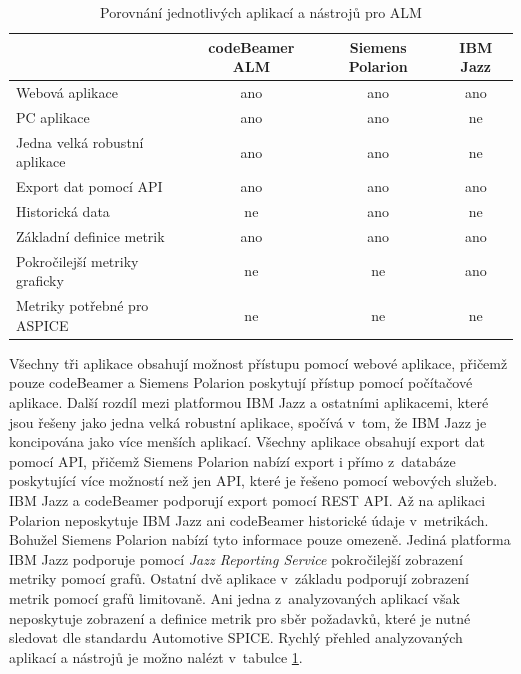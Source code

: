 \documentclass[czech,master]{diploma}
\begin{document}
\begin{table}[htp]
\begin{tabular}{@{}lccc@{}}
\toprule
\textbf{}                     & \textbf{codeBeamer ALM} & \textbf{Siemens Polarion} & \textbf{IBM Jazz} \\ \midrule
Webová aplikace               & ano                     & ano                       & ano               \\
PC aplikace                   & ano                     & ano                       & ne                \\
Jedna velká robustní aplikace & ano                     & ano                       & ne                \\
Export dat pomocí API         & ano                     & ano                       & ano               \\
Historická data               & ne                     & ano                       & ne                \\
Základní definice metrik      & ano                     & ano                       & ano               \\
Pokročilejší metriky graficky & ne                      & ne                        & ano               \\
Metriky potřebné pro ASPICE  & ne                      & ne                        & ne                \\ \bottomrule
\end{tabular}
\caption{Porovnání jednotlivých aplikací a nástrojů pro ALM}
\label{tab:alm_porovnani}
\end{table}

\newpage

Všechny tři aplikace obsahují možnost přístupu pomocí webové aplikace, přičemž pouze codeBeamer a Siemens Polarion poskytují přístup pomocí počítačové aplikace. Další rozdíl mezi platformou IBM Jazz a ostatními aplikacemi, které jsou řešeny jako jedna velká robustní aplikace, spočívá v~tom, že IBM Jazz je koncipována jako více menších aplikací. Všechny aplikace obsahují export dat pomocí API, přičemž Siemens Polarion nabízí export i přímo z~databáze poskytující více možností než jen API, které je řešeno pomocí webových služeb. IBM Jazz a codeBeamer podporují export pomocí REST API. Až na aplikaci Polarion neposkytuje IBM Jazz ani codeBeamer historické údaje v~metrikách. Bohužel Siemens Polarion nabízí tyto informace pouze omezeně. Jediná platforma IBM Jazz podporuje pomocí \textit{Jazz Reporting Service} pokročilejší zobrazení metriky pomocí grafů. Ostatní dvě aplikace v~základu podporují zobrazení metrik pomocí grafů limitovaně. Ani jedna z~analyzovaných aplikací však neposkytuje zobrazení a definice metrik pro sběr požadavků, které je nutné sledovat dle standardu Automotive SPICE. Rychlý přehled analyzovaných aplikací a nástrojů je možno nalézt v~tabulce \ref{tab:alm_porovnani}.
\end{document}
